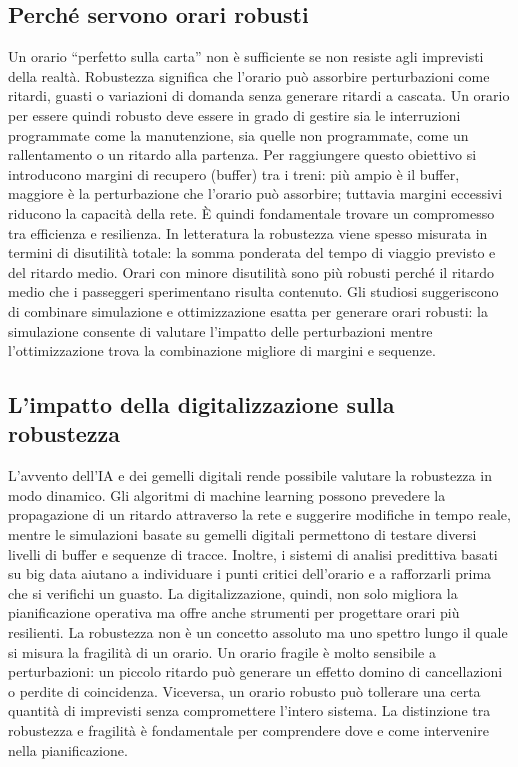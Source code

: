 \documentclass[a4paper,12pt]{report}
\begin{document}
\subsection{Perché servono orari robusti}
Un orario “perfetto sulla carta” non è sufficiente se non resiste agli imprevisti della realtà. Robustezza significa che l’orario può assorbire perturbazioni come ritardi, guasti o variazioni di domanda senza generare ritardi a cascata. Un orario per essere quindi robusto deve essere in grado di gestire sia le interruzioni programmate come la manutenzione, sia quelle non programmate, come un rallentamento o un ritardo alla partenza.
Per raggiungere questo obiettivo si introducono margini di recupero (buffer) tra i treni: più ampio è il buffer, maggiore è la perturbazione che l’orario può assorbire; tuttavia margini eccessivi riducono la capacità della rete. È quindi fondamentale trovare un compromesso tra efficienza e resilienza.
In letteratura la robustezza viene spesso misurata in termini di disutilità totale: la somma ponderata del tempo di viaggio previsto e del ritardo medio. Orari con minore disutilità sono più robusti perché il ritardo medio che i passeggeri sperimentano risulta contenuto.
Gli studiosi suggeriscono di combinare simulazione e ottimizzazione esatta per generare orari robusti: la simulazione consente di valutare l’impatto delle perturbazioni mentre l’ottimizzazione trova la combinazione migliore di margini e sequenze.
\subsection{L’impatto della digitalizzazione sulla robustezza}
L’avvento dell’IA e dei gemelli digitali rende possibile valutare la robustezza in modo dinamico. Gli algoritmi di machine learning possono prevedere la propagazione di un ritardo attraverso la rete e suggerire modifiche in tempo reale, mentre le simulazioni basate su gemelli digitali permettono di testare diversi livelli di buffer e sequenze di tracce. 
Inoltre, i sistemi di analisi predittiva basati su big data aiutano a individuare i punti critici dell’orario e a rafforzarli prima che si verifichi un guasto.
La digitalizzazione, quindi, non solo migliora la pianificazione operativa ma offre anche strumenti per progettare orari più resilienti.
La robustezza non è un concetto assoluto ma uno spettro lungo il quale si misura la fragilità di un orario. Un orario fragile è molto sensibile a perturbazioni: un piccolo ritardo può generare un effetto domino di cancellazioni o perdite di coincidenza. Viceversa, un orario robusto può tollerare una certa quantità di imprevisti senza compromettere l’intero sistema. La distinzione tra robustezza e fragilità è fondamentale per comprendere dove e come intervenire nella pianificazione.
\end{document}
